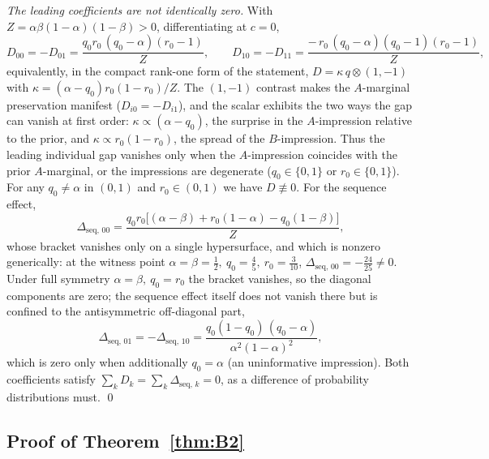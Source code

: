 \documentclass[review,12pt,authoryear]{elsarticle}
\theoremstyle{remark}
\theoremstyle{definition}
\begin{document}
\emph{The leading coefficients are not identically zero.} With
$Z=\alpha\beta(1-\alpha)(1-\beta)>0$, differentiating at $c=0$,
\[
  D_{00}=-D_{01}=\frac{q_0 r_0\,(q_0-\alpha)(r_0-1)}{Z},
  \qquad
  D_{10}=-D_{11}=\frac{-\,r_0\,(q_0-\alpha)(q_0-1)(r_0-1)}{Z},
\]
equivalently, in the compact rank-one form of the statement,
$D=\kappa\,q\otimes(1,-1)$ with $\kappa=(\alpha-q_0)r_0(1-r_0)/Z$. The $(1,-1)$ contrast makes
the $A$-marginal preservation manifest ($D_{i0}=-D_{i1}$), and the scalar exhibits the two ways
the gap can vanish at first order: $\kappa\propto(\alpha-q_0)$, the surprise in the
$A$-impression relative to the prior, and $\kappa\propto r_0(1-r_0)$, the spread of the
$B$-impression. Thus the leading individual gap vanishes only when the $A$-impression coincides
with the prior $A$-marginal, or the impressions are degenerate ($q_0\in\{0,1\}$ or
$r_0\in\{0,1\}$). For any $q_0\neq\alpha$ in $(0,1)$ and $r_0\in(0,1)$ we have $D\not\equiv0$.
For the sequence effect,
\[
  \Delta_{\mathrm{seq},\,00}
   =\frac{q_0 r_0\big[(\alpha-\beta)+r_0(1-\alpha)-q_0(1-\beta)\big]}{Z},
\]
whose bracket vanishes only on a single hypersurface, and which is nonzero generically: at the
witness point $\alpha=\beta=\tfrac12,\ q_0=\tfrac45,\ r_0=\tfrac3{10}$,
$\Delta_{\mathrm{seq},\,00}=-\tfrac{24}{25}\neq0$. Under full symmetry $\alpha=\beta,\ q_0=r_0$
the bracket vanishes, so the diagonal components are zero; the sequence effect itself does not
vanish there but is confined to the antisymmetric off-diagonal part,
\[
  \Delta_{\mathrm{seq},\,01}=-\Delta_{\mathrm{seq},\,10}
   =\frac{q_0(1-q_0)\,(q_0-\alpha)}{\alpha^{2}(1-\alpha)^{2}},
\]
which is zero only when additionally $q_0=\alpha$ (an uninformative impression). Both
coefficients satisfy $\sum_k D_k=\sum_k\Delta_{\mathrm{seq},\,k}=0$, as a difference of
probability distributions must. \qed

\subsection{Proof of Theorem~\ref{thm:B2}}
\end{document}
